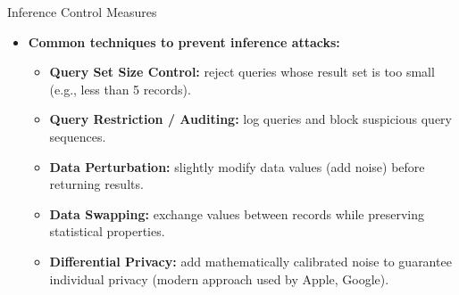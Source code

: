 \begin{frame}{Inference Control Measures}
    \Large
    
    \begin{itemize}
        \vspace{-0.5cm}
        \item \textbf{Common techniques to prevent inference attacks:}
        \vspace{0.2cm}
        
        \begin{itemize}
            \large
            \setlength{\itemsep}{0.2cm}
            
            \item \textbf{Query Set Size Control:} reject queries whose result set is too small (e.g., less than 5 records).
            
            \item \textbf{Query Restriction / Auditing:} log queries and block suspicious query sequences.
            
            \item \textbf{Data Perturbation:} slightly modify data values (add noise) before returning results.
            
            \item \textbf{Data Swapping:} exchange values between records while preserving statistical properties.
            
            \item \textbf{Differential Privacy:} add mathematically calibrated noise to guarantee individual privacy (modern approach used by Apple, Google).
        \end{itemize}
    \end{itemize}
\end{frame}

